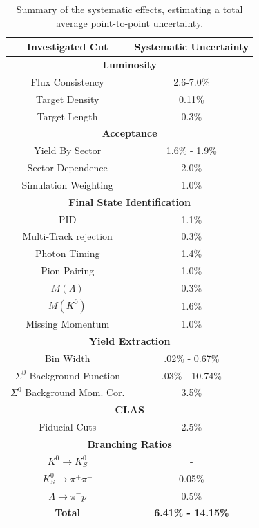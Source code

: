 \documentclass[prb,10pt,twocolumn,tightenlines,superscriptaddress]{revtex4-1}
\begin{document}
\begin{table}[h]
\centering
\caption{Summary of the systematic effects, estimating a total average point-to-point uncertainty.}
\label{tab:sysuncert}
\begin{tabular}{|c|c|}
\hline
{\bf Investigated Cut} & {\bf Systematic Uncertainty} \\ \hline
\multicolumn{2}{|c|}{{\bf Luminosity} } \\ \hline
Flux Consistency                  &    2.6-7.0\%    \\ \hline
Target Density                    &    0.11\%    \\ \hline
Target Length                     &    0.3\%    \\ \hline
\multicolumn{2}{|c|}{{\bf Acceptance} } \\ \hline
Yield By Sector                   &   1.6\% - 1.9\%    \\ \hline
Sector Dependence                 &   2.0\%    \\ \hline
Simulation Weighting              &   1.0\%    \\ \hline
\multicolumn{2}{|c|}{{\bf Final State Identification} } \\ \hline
PID                               &   1.1\%    \\ \hline
Multi-Track rejection             &   0.3\%    \\ \hline
Photon Timing                     &   1.4\%    \\ \hline
Pion Pairing                      &   1.0\%    \\ \hline
$M(\Lambda)$                      &   0.3\%    \\ \hline
$M(K^{0})$                        &   1.6\%    \\ \hline
Missing Momentum                  &   1.0\%    \\ \hline
\multicolumn{2}{|c|}{{\bf Yield Extraction} } \\ \hline
Bin Width                         &   .02\% - 0.67\%    \\ \hline
$\Sigma^{0}$ Background Function  &   .03\% - 10.74\%    \\ \hline
$\Sigma^{0}$ Background Mom. Cor. &   3.5\%    \\ \hline 
\multicolumn{2}{|c|}{{\bf CLAS} } \\ \hline
Fiducial Cuts                     &   2.5\%    \\ \hline
\multicolumn{2}{|c|}{{\bf Branching Ratios} } \\ \hline
$K^{0}\rightarrow K^{0}_{S}$           &   -    \\ \hline
$K^{0}_{S}\rightarrow \pi^{+}\pi^{-}$  &   0.05\%  \\ \hline
$\Lambda \rightarrow \pi^{-}p$         &   0.5\%    \\ \hline
\multicolumn{1}{|c|}{{\bf Total} }   &   {\bf 6.41\% - 14.15\%}    \\ \hline
\end{tabular}
\end{table}
\end{document}
